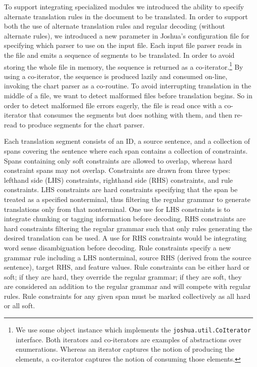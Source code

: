 \documentclass[logo]{pbml}
\begin{document}
To support integrating specialized modules we introduced the ability to specify alternate translation rules in the document to be translated. In order to support both the use of alternate translation rules and regular decoding (without alternate rules), we introduced a new parameter in Joshua's configuration file for specifying which parser to use on the input file. Each input file parser reads in the file and emits a sequence of segments to be translated. In order to avoid storing the whole file in memory, the sequence is returned as a co-iterator.\footnote{We use some object instance which implements the \texttt{joshua.util.CoIterator} interface. Both iterators and co-iterators are examples of abstractions over enumerations. Whereas an iterator captures the notion of producing the elements, a co-iterator captures the notion of consuming those elements.} By using a co-iterator, the sequence is produced lazily and consumed on-line, invoking the chart parser as a co-routine. To avoid interrupting translation in the middle of a file, we want to detect malformed files before translation begins. So in order to detect malformed file errors eagerly, the file is read once with a co-iterator that consumes the segments but does nothing with them, and then re-read to produce segments for the chart parser.

Each translation segment consists of an ID, a source sentence, and a collection of spans covering the sentence where each span contains a collection of constraints. Spans containing only soft constraints are allowed to overlap, whereas hard constraint spans may not overlap. Constraints are drawn from three types: lefthand side (LHS) constraints, righthand side (RHS) constraints, and rule constraints. LHS constraints are hard constraints specifying that the span be treated as a specified nonterminal, thus filtering the regular grammar to generate translations only from that nonterminal. One use for LHS constraints is to integrate chunking or tagging information before decoding. RHS constraints are hard constraints filtering the regular grammar such that only rules generating the desired translation can be used. A use for RHS constraints would be integrating word sense disambiguation before decoding. Rule constraints specify a new grammar rule including a LHS nonterminal, source RHS (derived from the source sentence), target RHS, and feature values. Rule constraints can be either hard or soft; if they are hard, they override the regular grammar; if they are soft, they are considered an addition to the regular grammar and will compete with regular rules. Rule constraints for any given span must be marked collectively as all hard or all soft.
\end{document}
